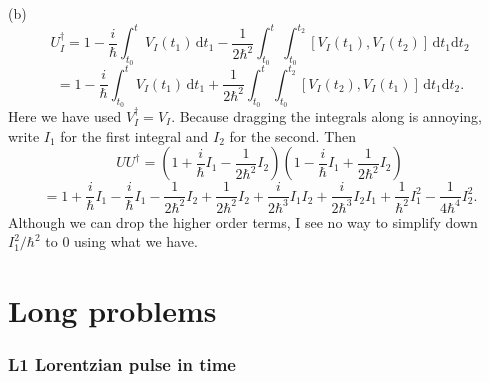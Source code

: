 \documentclass[11pt, letterpaper]{article}
\theoremstyle{plain}
\begin{document}
(b) 
\[
	U_I^\dagger=1-\frac{i}{\hbar} \int_{t_0}^{t} V_I(t_1) \,\mathrm{d} t_1 -\frac{1}{2\hbar^2} \int_{t_0}^{t}\int_{t_0}^{t_2} \left[ V_I(t_1),V_I(t_2) \right]  \,\mathrm{d} t_1 \mathrm{d} t_2
\]
\[
	=1-\frac{i}{\hbar} \int_{t_0}^{t} V_I(t_1) \,\mathrm{d} t_1+\frac{1}{2\hbar^2} \int_{t_0}^{t}\int_{t_0}^{t_2} \left[ V_I(t_2),V_I(t_1) \right]  \,\mathrm{d} t_1 \mathrm{d} t_2
.\]
Here we have used $V_I^\dagger=V_I$. Because dragging the integrals along is annoying, write $I_1$ for the first integral and $I_2$ for the second. Then
\[
	UU^\dagger = \left( 1+\frac{i}{\hbar} I_1-\frac{1}{2\hbar^2} I_2 \right) \left( 1-\frac{i}{\hbar} I_1+\frac{1}{2\hbar^2} I_2 \right) 
\]
\[
	=1+\frac{i}{\hbar} I_1 - \frac{i}{\hbar} I_1-\frac{1}{2\hbar^2} I_2 + \frac{1}{2\hbar^2} I_2 + \frac{i}{2\hbar^3} I_1I_2 + \frac{i}{2\hbar^3} I_2I_1 + \frac{1}{\hbar^2} I_1^2 - \frac{1}{4\hbar^4} I_2^2
.\]
Although we can drop the higher order terms, I see no way to simplify down $I^2_1/\hbar^2$ to 0 using what we have.


\part{Long problems}
\section{L1 Lorentzian pulse in time}
\end{document}
